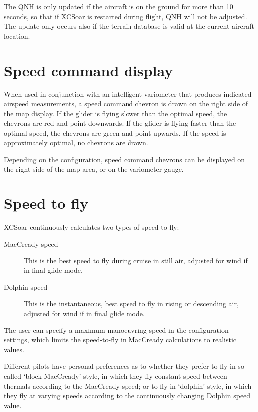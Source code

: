 \documentclass[a4paper,12pt]{refrep}
\begin{document}
The QNH is only updated if the aircraft is on the ground for more than
10 seconds, so that if XCSoar is restarted during flight, QNH will not
be adjusted.  The update only occurs also if the terrain database is
valid at the current aircraft location.

\section{Speed command display}

When used in conjunction with an intelligent variometer that produces
indicated airspeed measurements, a speed command chevron is drawn
on the right side of the map display.  If the glider is flying slower
than the optimal speed, the chevrons are red and point downwards.  If
the glider is flying faster than the optimal speed, the chevrons are
green and point upwards.  If the speed is approximately optimal, no
chevrons are drawn.


Depending on the configuration, speed command chevrons can be
displayed on the right side of the map area, or on the variometer
gauge.

\section{Speed to fly}

XCSoar continuously calculates two types of speed to fly:
\begin{description}
\item[MacCready speed]  This is the best speed to fly during cruise
  in still air, adjusted for wind if in final glide mode.
\item[Dolphin speed]  This is the instantaneous, best speed to fly
  in rising or descending air, adjusted for wind if in final glide
  mode.
\end{description}  

The user can specify a maximum manoeuvring speed in the configuration
settings, which limits the speed-to-fly in MacCready calculations to
realistic values.

Different pilots have personal preferences as to whether they prefer
to fly in so-called `block MacCready' style, in which they fly
constant speed between thermals according to the MacCready speed; or
to fly in `dolphin' style, in which they fly at varying speeds
according to the continuously changing Dolphin speed value.
\end{document}
